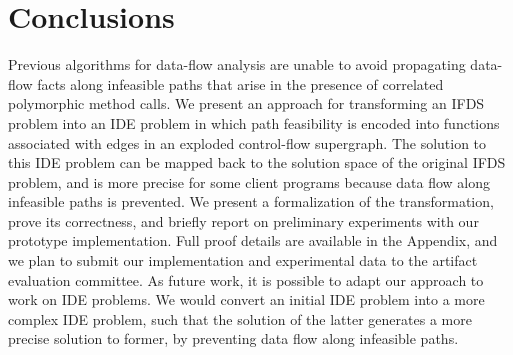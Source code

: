 \section{Conclusions}
  \label{sec:Conclusions}
  
Previous algorithms for data-flow analysis are unable to avoid propagating
data-flow facts along infeasible paths that arise in the presence of
correlated polymorphic method calls. 
% 
We present an approach for transforming an IFDS problem into an IDE problem
in which path feasibility is encoded into functions associated
with edges in an exploded control-flow supergraph. The solution to this
IDE problem can be mapped back to the solution space of the original IFDS
problem, and is more precise for some client programs because data flow along
infeasible paths is prevented. We present a formalization of the
transformation, prove its correctness, and briefly report on
preliminary experiments with our prototype implementation. Full proof
details are available in the Appendix,
and we plan to submit our implementation and experimental data to the
artifact evaluation committee. 
%  
As future work, it is possible to adapt our approach to work on IDE
problems. We would convert an initial IDE problem into a more complex IDE problem, 
such that the solution of the latter generates a more precise
solution to former, by preventing data flow along infeasible paths.
